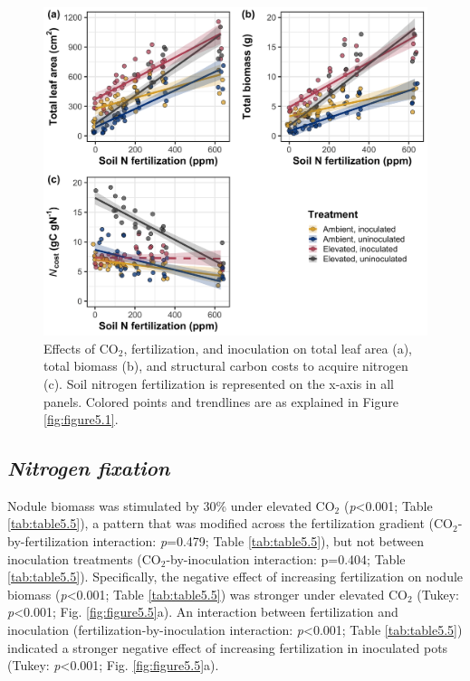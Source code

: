 \newpage
\begin{figure}
    \centering
    \includegraphics[width=\linewidth]{ch5_NxCO2xI/figs/NxCO2xI_fig4_wholePlant.png}
    \caption[Effects of CO$_2$, fertilization, and inoculation on total leaf area, total biomass, and structural carbon costs to acquire nitrogen]{Effects of CO$_2$, fertilization, and inoculation on total leaf area (a), total biomass (b), and structural carbon costs to acquire nitrogen (c). Soil nitrogen fertilization is represented on the x-axis in all panels. Colored points and trendlines are as explained in Figure \ref{fig:figure5.1}.}
    \label{fig:figure5.4}
\end{figure}
\clearpage

\subsection{\textit{Nitrogen fixation}}
\noindent Nodule biomass was stimulated by 30\% under elevated CO$_2$ (\textit{p}<0.001; Table \ref{tab:table5.5}), a pattern that was modified across the fertilization gradient (CO$_2$-by-fertilization interaction: \textit{p}=0.479; Table \ref{tab:table5.5}), but not between inoculation treatments (CO$_2$-by-inoculation interaction: p=0.404; Table \ref{tab:table5.5}). Specifically, the negative effect of increasing fertilization on nodule biomass (\textit{p}<0.001; Table \ref{tab:table5.5}) was stronger under elevated CO$_2$ (Tukey: \textit{p}<0.001; Fig. \ref{fig:figure5.5}a). An interaction between fertilization and inoculation (fertilization-by-inoculation interaction: \textit{p}<0.001; Table \ref{tab:table5.5}) indicated a stronger negative effect of increasing fertilization in inoculated pots (Tukey: \textit{p}<0.001; Fig. \ref{fig:figure5.5}a).

